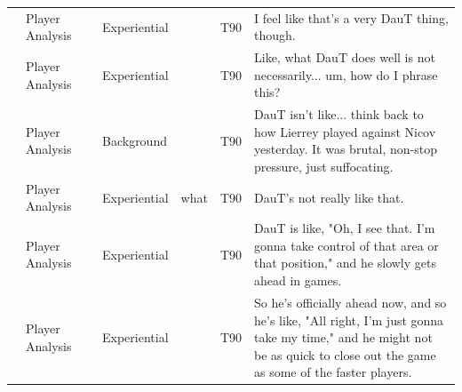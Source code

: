{\begin{longtable}{@{}>{\theAppRow}r|L{2.3cm}L{2.2cm}L{1.4cm}L{2.2cm}L{0.5cm}U{5.6cm}@{}}
    & Player Analysis       &                      & Experiential &                   & T90     & I feel like that's a very DauT thing, though.                                                                                                                                                                            \\
    & Player Analysis       &                      & Experiential &                   & T90     & Like, what DauT does well is not necessarily... um, how do I phrase this?                                                                                                                                                \\
    & Player Analysis       &                      & Background  &                   & T90     & DauT isn't like... think back to how Lierrey played against Nicov yesterday. It was brutal, non-stop pressure, just suffocating.                                                                                         \\
    & Player Analysis       &                      & Experiential & what              & T90     & DauT's not really like that.                                                                                                                                                                                             \\
    & Player Analysis       &                      & Experiential &                   & T90     & DauT is like, "Oh, I see that. I'm gonna take control of that area or that position," and he slowly gets ahead in games.                                                                                                 \\
    & Player Analysis       &                      & Experiential &                   & T90     & So he's officially ahead now, and so he's like, "All right, I'm just gonna take my time," and he might not be as quick to close out the game as some of the faster players.                                              \\
  \end{longtable}
} %

